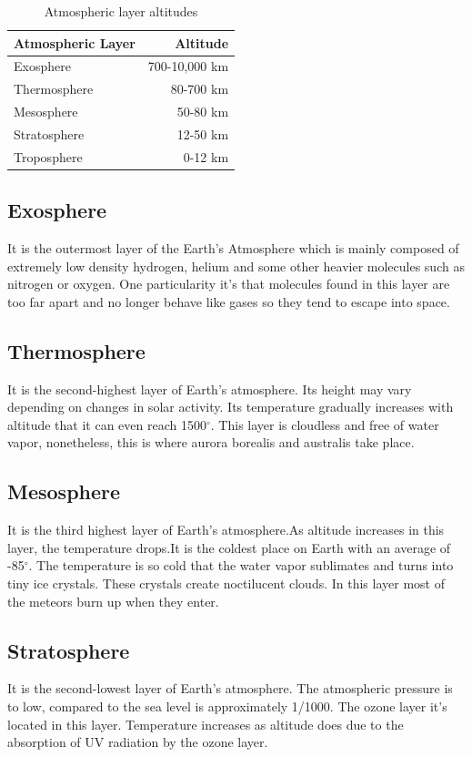 \documentclass[a4paper]{article}
\begin{document}
\begin{table}[h!]
\centering
\begin{tabular}{l|r}
\centering
Atmospheric Layer & Altitude \\\hline
Exosphere & 700-10,000 km \\
Thermosphere & 80-700 km\\
Mesosphere & 50-80 km \\
Stratosphere & 12-50 km \\
Troposphere & 0-12 km
\end{tabular}
\caption{\label{tab:widgets}Atmospheric layer altitudes}
\end{table}

\subsection{Exosphere}
It is the outermost layer of the Earth’s Atmosphere which is mainly composed of extremely low density hydrogen, helium and some other heavier molecules such as nitrogen or oxygen. One particularity it’s that molecules found in this layer are too far apart and no longer behave like gases so they tend to escape into space. 

\subsection{Thermosphere}
It is the second-highest layer of Earth's atmosphere. Its height may vary depending on changes in solar activity. Its temperature gradually increases with altitude that it can even reach 1500$^{\circ}$. This layer is cloudless and free of water vapor, nonetheless, this is where aurora borealis and australis take place.

\subsection{Mesosphere}
It is the third highest layer of Earth's atmosphere.As altitude increases in this layer, the temperature drops.It is the coldest place on Earth with an average of -85$^{\circ}$. The temperature is so cold that the water vapor sublimates and turns into  tiny ice crystals. These crystals create noctilucent clouds. In this layer most of the meteors burn up when they enter. 

\subsection{Stratosphere}
It is the second-lowest layer of Earth's atmosphere. The atmospheric pressure is to low, compared to the sea level is approximately 1/1000. The ozone layer it's located in this layer. Temperature increases as altitude does due to the absorption of UV radiation by the ozone layer. 
\end{document}

